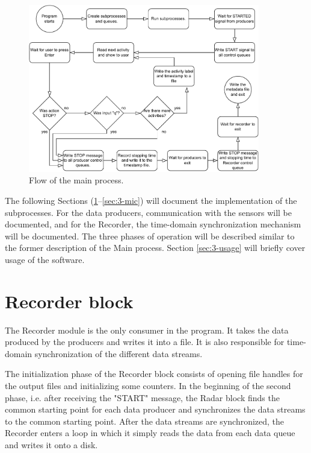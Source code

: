 \begin{figure}[H]
    \centering
    \includegraphics[width=0.9\textwidth]{fig/3/main-flowchart.pdf}
    \caption{Flow of the main process.}
    \label{fig:3-main-flowchart}
\end{figure}

The following Sections (\ref{sec:3-recorder}--\ref{sec:3-mic}) will document the implementation of the subprocesses.
For the data producers, communication with the sensors will be documented, and for the Recorder,
the time-domain synchronization mechanism will be documented.
The three phases of operation will be described similar to the former description of the Main process.
Section \ref{sec:3-usage} will briefly cover usage of the software.

\section{Recorder block}
\label{sec:3-recorder}
The Recorder module is the only consumer in the program.
It takes the data produced by the producers and writes it into a file.
It is also responsible for time-domain synchronization of the different data streams.

The initialization phase of the Recorder block consists of opening file handles for the output files and initializing some counters.
In the beginning of the second phase, i.e. after receiving the "START" message,
the Radar block finds the common starting point for each data producer and synchronizes the data streams to the common starting point.
After the data streams are synchronized, the Recorder enters a loop in which it simply reads the data from each data queue and writes it onto a disk.

